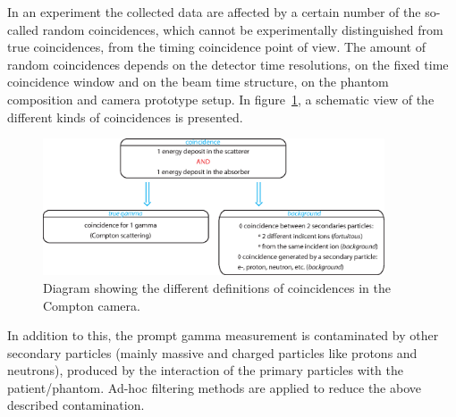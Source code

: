 In an experiment the collected data are affected by a certain number of the so-called random coincidences, which cannot be experimentally distinguished from true coincidences, from the timing coincidence point of view. The amount of random coincidences depends on the detector time resolutions, on the fixed time coincidence window and on the beam time structure, on the phantom composition and camera prototype setup. In figure~\ref{fig:fig_explication_coincidence_CC_simulation_Hadronth}, a schematic view of the different kinds of coincidences is presented.

\begin{figure}
  \centering
  \includegraphics[width=0.9\textwidth]{./Figure/Schema_coincidence_EN.eps}
  \caption{Diagram showing the different definitions of coincidences in the Compton camera.}
  \label{fig:fig_explication_coincidence_CC_simulation_Hadronth}
\end{figure}

In addition to this, the prompt gamma measurement is contaminated by other secondary particles (mainly massive and charged particles like protons and neutrons), produced by the interaction of the primary particles with the patient/phantom.
Ad-hoc filtering methods are applied to reduce the above described contamination.


